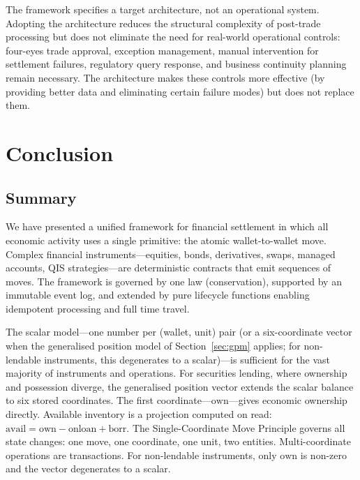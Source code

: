 \documentclass[11pt,a4paper]{article}
\begin{document}
The framework specifies a target architecture, not an operational system. Adopting the architecture reduces the structural complexity of post-trade processing but does not eliminate the need for real-world operational controls: four-eyes trade approval, exception management, manual intervention for settlement failures, regulatory query response, and business continuity planning remain necessary. The architecture makes these controls more effective (by providing better data and eliminating certain failure modes) but does not replace them.

\clearpage
\section{Conclusion}
\label{sec:conclusion}

\subsection{Summary}

We have presented a unified framework for financial settlement in which all economic activity uses a single primitive: the atomic wallet-to-wallet move. Complex financial instruments---equities, bonds, derivatives, swaps, managed accounts, QIS strategies---are deterministic contracts that emit sequences of moves. The framework is governed by one law (conservation), supported by an immutable event log, and extended by pure lifecycle functions enabling idempotent processing and full time travel.

The scalar model---one number per (wallet, unit) pair (or a six-coordinate vector when the generalised position model of Section~\ref{sec:gpm} applies; for non-lendable instruments, this degenerates to a scalar)---is sufficient for the vast majority of instruments and operations. For securities lending, where ownership and possession diverge, the generalised position vector extends the scalar balance to six stored coordinates. The first coordinate---$\mathrm{own}$---gives economic ownership directly. Available inventory is a projection computed on read: $\mathrm{avail} = \mathrm{own} - \mathrm{onloan} + \mathrm{borr}$. The Single-Coordinate Move Principle governs all state changes: one move, one coordinate, one unit, two entities. Multi-coordinate operations are transactions. For non-lendable instruments, only $\mathrm{own}$ is non-zero and the vector degenerates to a scalar.
\end{document}
